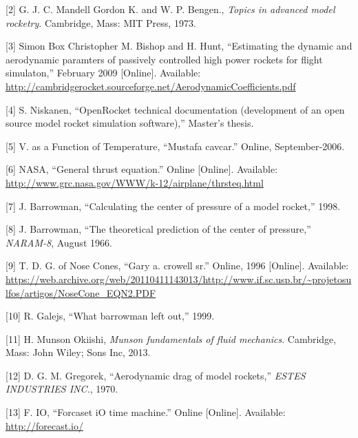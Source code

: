 \documentclass[]{article}
\begin{document}
{[}2{]} G. J. C. Mandell Gordon K. and W. P. Bengen., \emph{Topics in
advanced model rocketry}. Cambridge, Mass: MIT Press, 1973.

{[}3{]} Simon Box Christopher M. Bishop and H. Hunt, ``Estimating the
dynamic and aerodynamic paramters of passively controlled high power
rockets for flight simulaton,'' February 2009 {[}Online{]}. Available:
\url{http://cambridgerocket.sourceforge.net/AerodynamicCoefficients.pdf}

{[}4{]} S. Niskanen, ``OpenRocket technical documentation (development
of an open source model rocket simulation software),'' Master's thesis.

{[}5{]} V. as a Function of Temperature, ``Mustafa cavcar.'' Online,
September-2006.

{[}6{]} NASA, ``General thrust equation.'' Online {[}Online{]}.
Available: \url{http://www.grc.nasa.gov/WWW/k-12/airplane/thrsteq.html}

{[}7{]} J. Barrowman, ``Calculating the center of pressure of a model
rocket,'' 1998.

{[}8{]} J. Barrowman, ``The theoretical prediction of the center of
pressure,'' \emph{NARAM-8}, August 1966.

{[}9{]} T. D. G. of Nose Cones, ``Gary a. crowell sr.'' Online, 1996
{[}Online{]}. Available:
\url{https://web.archive.org/web/20110411143013/http://www.if.sc.usp.br/~projetosulfos/artigos/NoseCone_EQN2.PDF}

{[}10{]} R. Galejs, ``What barrowman left out,'' 1999.

{[}11{]} H. Munson Okiishi, \emph{Munson fundamentals of fluid
mechanics}. Cambridge, Mass: John Wiley; Sons Inc, 2013.

{[}12{]} D. G. M. Gregorek, ``Aerodynamic drag of model rockets,''
\emph{ESTES INDUSTRIES INC.}, 1970.

{[}13{]} F. IO, ``Forcaset iO time machine.'' Online {[}Online{]}.
Available: \url{http://forecast.io/}
\end{document}
